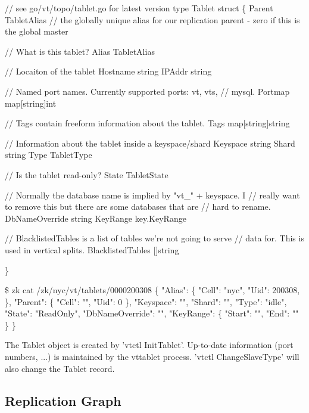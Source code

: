 \begin{codesample2}
  // see go/vt/topo/tablet.go for latest version
  type Tablet struct \{
      Parent      TabletAlias // the globally unique alias for our replication parent - zero if this is the global master
  
      // What is this tablet?
      Alias TabletAlias
  
      // Locaiton of the tablet
      Hostname string
      IPAddr   string
  
      // Named port names. Currently supported ports: vt, vts,
      // mysql.
      Portmap map[string]int
  
      // Tags contain freeform information about the tablet.
      Tags map[string]string
  
      // Information about the tablet inside a keyspace/shard
      Keyspace string
      Shard    string
      Type     TabletType
  
      // Is the tablet read-only?
      State TabletState
  
      // Normally the database name is implied by "vt_" + keyspace. I
      // really want to remove this but there are some databases that are
      // hard to rename.
      DbNameOverride string
      KeyRange       key.KeyRange
      
      // BlacklistedTables is a list of tables we're not going to serve
      // data for. This is used in vertical splits.
      BlacklistedTables []string
  
  \}
\end{codesample2}

\begin{codesample2}

  \$ zk cat /zk/nyc/vt/tablets/0000200308
  \{
    "Alias": \{
      "Cell": "nyc",
      "Uid": 200308,
    \},
    "Parent": \{
      "Cell": "",
      "Uid": 0
    \},
    "Keyspace": "",
    "Shard": "",
    "Type": "idle",
    "State": "ReadOnly",
    "DbNameOverride": "",
    "KeyRange": \{
      "Start": "",
      "End": ""
    \}
  \}
\end{codesample2}

The Tablet object is created by 'vtctl InitTablet'. Up-to-date information (port numbers, ...) is maintained by the vttablet process. 'vtctl ChangeSlaveType' will also change the Tablet record.

\subsection{Replication Graph}

